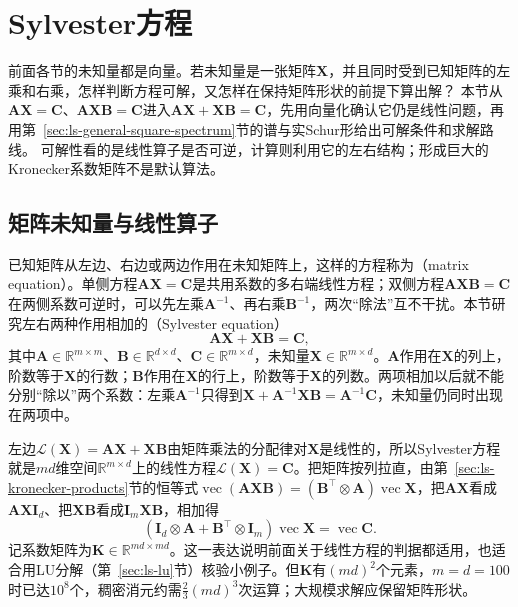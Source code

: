 
\section{Sylvester方程}
\label{sec:ls-matrix-equations}

前面各节的未知量都是向量。若未知量是一张矩阵$\bm X$，并且同时受到已知矩阵的左乘和右乘，怎样判断方程可解，又怎样在保持矩阵形状的前提下算出解？
本节从$\bm A\bm X=\bm C$、$\bm A\bm X\bm B=\bm C$进入$\bm A\bm X+\bm X\bm B=\bm C$，先用向量化确认它仍是线性问题，再用第~\ref{sec:ls-general-square-spectrum}节的谱与实Schur形给出可解条件和求解路线。
可解性看的是线性算子是否可逆，计算则利用它的左右结构；形成巨大的Kronecker系数矩阵不是默认算法。

\subsection{矩阵未知量与线性算子}
\label{sec:ls-matrix-equation-types}

已知矩阵从左边、右边或两边作用在未知矩阵上，这样的方程称为（matrix equation）。单侧方程$\bm A\bm X=\bm C$是共用系数的多右端线性方程；双侧方程$\bm A\bm X\bm B=\bm C$在两侧系数可逆时，可以先左乘$\bm A^{-1}$、再右乘$\bm B^{-1}$，两次“除法”互不干扰。本节研究左右两种作用相加的（Sylvester equation）
\[
 \bm A\bm X+\bm X\bm B=\bm C,
\]
其中$\bm A\in\mathbb R^{m\times m}$、$\bm B\in\mathbb R^{d\times d}$、$\bm C\in\mathbb R^{m\times d}$，未知量$\bm X\in\mathbb R^{m\times d}$。$\bm A$作用在$\bm X$的列上，阶数等于$\bm X$的行数；$\bm B$作用在$\bm X$的行上，阶数等于$\bm X$的列数。两项相加以后就不能分别“除以”两个系数：左乘$\bm A^{-1}$只得到$\bm X+\bm A^{-1}\bm X\bm B=\bm A^{-1}\bm C$，未知量仍同时出现在两项中。

左边$\mathcal L(\bm X)=\bm A\bm X+\bm X\bm B$由矩阵乘法的分配律对$\bm X$是线性的，所以Sylvester方程就是$md$维空间$\mathbb R^{m\times d}$上的线性方程$\mathcal L(\bm X)=\bm C$。把矩阵按列拉直，由第~\ref{sec:ls-kronecker-products}节的恒等式$\operatorname{vec}(\bm A\bm X\bm B)=(\bm B^\top\otimes\bm A)\operatorname{vec}\bm X$，把$\bm A\bm X$看成$\bm A\bm X\bm I_d$、把$\bm X\bm B$看成$\bm I_m\bm X\bm B$，相加得
\begin{equation}
 (\bm I_d\otimes\bm A+\bm B^\top\otimes\bm I_m)\operatorname{vec}\bm X
 =\operatorname{vec}\bm C .
 \label{eq:ls-sylvester-vectorized}
\end{equation}
记系数矩阵为$\bm K\in\mathbb R^{md\times md}$。这一表达说明前面关于线性方程的判据都适用，也适合用LU分解（第~\ref{sec:ls-lu}节）核验小例子。但$\bm K$有$(md)^2$个元素，$m=d=100$时已达$10^8$个，稠密消元约需$\tfrac23(md)^3$次运算；大规模求解应保留矩阵形状。

